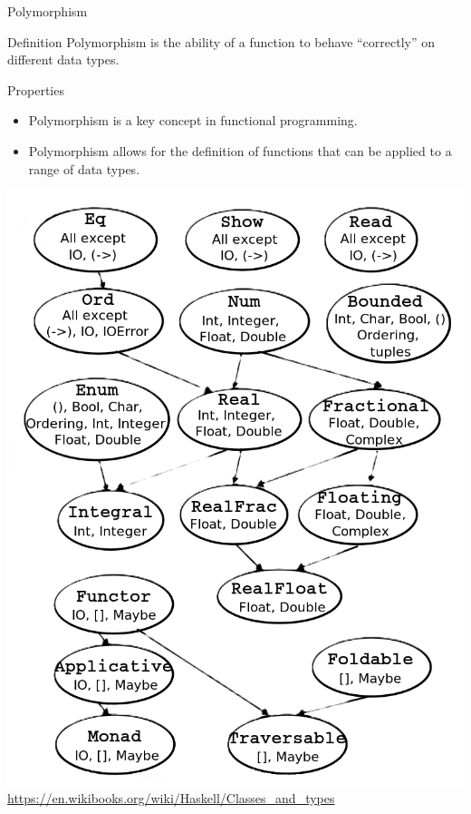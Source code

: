 \begin{frame}{Polymorphism}
    \begin{block}{Definition}
        Polymorphism is the ability of a function to behave ``correctly'' on different data types.
    \end{block}
    \begin{block}{Properties}
        \begin{itemize}
            \item Polymorphism is a key concept in functional programming.
            \item Polymorphism allows for the definition of functions that can be applied to a range of data types.
        \end{itemize}
    \end{block}
\end{frame}
\begin{frame}
    \centering
    \includegraphics[height=.8\textheight]{resources/figures/lecture_01/typing/Base_classes_hierarchy.png}
    {\tiny \url{https://en.wikibooks.org/wiki/Haskell/Classes_and_types}}
\end{frame}